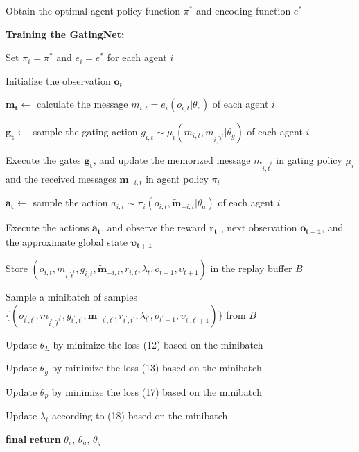 \documentclass[letterpaper]{article} %
\begin{document}
\begin{algorithm*}[h]
Obtain the optimal agent policy function $\pi^*$ and encoding function $e^*$

\textbf{Training the GatingNet:}

Set $\pi_{i}=\pi^*$ and $e_{i}=e^*$ for each agent $i$

{
    Initialize the observation $\boldsymbol{o}_t$

    {
        $\boldsymbol{m_{t}} \gets$ calculate the message  $m_{i,t}=e_{i}\left( o_{i,t} | \theta_e \right)$ of each agent $i$

        $\boldsymbol{g_{t}} \gets$ sample the gating action  $g_{i,t} \sim \mu_{i} ( m_{i,t}, m_{i,\hat{t}^i} | \theta_g)$ of each agent $i$

        Execute the gates $\boldsymbol{g_{t}}$, and
        update the memorized message $m_{i,\hat{t}^i}$ in gating policy $\mu_i$ and the received messages $\tilde{\boldsymbol{m}}_{-i,t}$ in agent policy $\pi_i$

        $\boldsymbol{a_{t}} \gets$ sample the action  $a_{i,t} \sim \pi_{i} \left( o_{i,t}, \tilde{\boldsymbol{m}}_{-i,t} | \theta_a \right)$ of each agent $i$

        Execute the actions $\boldsymbol{a_{t}}$, and observe the reward $\boldsymbol{r_t}$ , next observation $\boldsymbol{o_{t+1}}$, and the approximate global state $\boldsymbol{\upsilon_{t+1}}$

        Store $(o_{i,t}, m_{i,\hat{t}^i}, g_{i,t}, \tilde{\boldsymbol{m}}_{-i,t}, r_{i,t}, \lambda_t, o_{t+1}, \upsilon_{t+1})$ in the replay buffer $B$

        Sample a minibatch of samples $\{(o_{i^{'},t^{'}}, m_{i^{'},\hat{t}^{i^{'}}}, g_{i^{'},t^{'}}, \tilde{\boldsymbol{m}}_{-i^{'},t^{'}}, r_{i^{'},t^{'}}, \lambda_{t^{'}}, o_{t^{'}+1}, \upsilon_{i^{'},t^{'}+1}) \}$ from $B$

        Update  $\theta_L$ by minimize the loss (12) based on the minibatch

        Update  $\theta_g$ by minimize the loss (13) based on the minibatch

        Update  $\theta_p$ by minimize the loss (17) based on the minibatch

        Update  $\lambda_t$  according to (18) based on the minibatch

    }
}

\textbf{final} \;
\textbf{return} $\theta_e$, $\theta_a$, $\theta_g$
\end{algorithm*}
\end{document}
